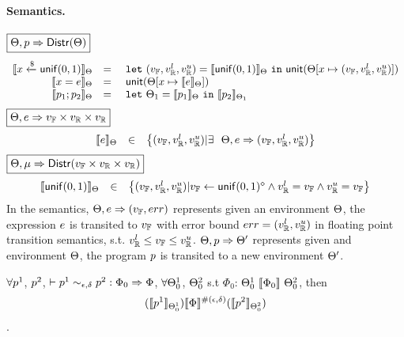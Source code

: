 \documentclass[a4paper,11pt]{article}
\begin{document}
\paragraph{Semantics.}
$\boxed{\Theta, p \Rightarrow \mathsf{Distr}(\Theta)}$
\[
	\begin{array}{rcl}
	\llbracket x \xleftarrow{\$} \mathsf{unif}(0, 1) \rrbracket_{\Theta}
	& = & 
	~\mathtt{let}~ (v_{\mathbb{F}}, v_{\mathbb{R}}^{l}, v_{\mathbb{R}}^{u}) = \llbracket \mathsf{unif}(0, 1) \rrbracket_{\Theta} 
	~\mathtt{in}~ 
	\mathsf{unit}(\Theta[x \mapsto (v_{\mathbb{F}}, v_{\mathbb{R}}^{l}, v_{\mathbb{R}}^{u})])
	\\
	\llbracket x = e \rrbracket_{\Theta}
	& = &  
	~\mathsf{unit}(\Theta[x \mapsto \llbracket e \rrbracket_{\Theta}])
	\\
	\llbracket p_1; p_2 \rrbracket_{\Theta}
	& = &  ~\mathtt{let}~  \Theta_1 = 
	\llbracket p_1 \rrbracket_{\Theta} ~\mathtt{in}~
	\llbracket p_2 \rrbracket_{\Theta_1} 
	\end{array}
\]
$\boxed{\Theta, e \Rightarrow v_{\mathbb{F}} \times v_{\mathbb{R}} \times v_{\mathbb{R}}}$
\[
	\begin{array}{rcl}
	\llbracket e \rrbracket_{\Theta}
	& \in &  
	\big\{(v_{\mathbb{F}}, v_{\mathbb{R}}^{l}, v_{\mathbb{R}}^{u}) |
	\exists ~~  
	\Theta,  
	e \Rightarrow (v_{\mathbb{F}}, v_{\mathbb{R}}^{l}, v_{\mathbb{R}}^{u})\big\}
	\end{array}
\]
$
\boxed{\Theta, \mu \Rightarrow \mathsf{Distr}(v_{\mathbb{F}} \times v_{\mathbb{R}} \times v_{\mathbb{R}})}
$
\[
	\begin{array}{rcl}
	\llbracket \mathsf{unif}(0, 1) \rrbracket_{\Theta}
	& \in & 
	\big\{
	(v_{\mathbb{F}}, v_{\mathbb{R}}^{l}, v_{\mathbb{R}}^{u}) |
	v_{\mathbb{F}} \leftarrow \mathsf{unif}(0, 1)^{\diamond}
	\land v_{\mathbb{R}}^{l} = v_{\mathbb{F}}
	\land v_{\mathbb{R}}^{u} = v_{\mathbb{F}}
	\big\}
	\end{array}
\]
In the semantics, 
$\Theta, e \Rightarrow (v_{\mathbb{F}}, err)$ represents given an environment $\Theta$, the expression $e$
is transited to $v_{\mathbb{F}}$ with error bound $err = (v_{\mathbb{R}}^{l}, v_{\mathbb{R}}^{u})$ in floating point transition semantics, s.t. $v_{\mathbb{R}}^{l} \leq v_{\mathbb{F}} \leq v_{\mathbb{R}}^{u}$. 
$\Theta, p \Rightarrow \Theta'$ represents given and environment $\Theta$, the program $p$ is transited to a new environment $\Theta'$.


\clearpage
\begin{thm}[Soundness]
 $\forall p^1$, $p^2$,  $ \vdash p^1	
\sim_{\epsilon, \delta} 
p^2 :
\Phi_0 \Rightarrow \Phi $,    $\forall \Theta^1_0$, $\Theta^2_0$ 
s.t $\Phi_0$: 
$\Theta^1_0 ~ \llbracket \Phi_0 \rrbracket ~ \Theta^2_0$,
then
$$ 
(\llbracket p^1 \rrbracket_{\Theta^1_0})  
\llbracket \Phi \rrbracket^{\#(\epsilon, \delta)} 
(\llbracket p^2 \rrbracket_{\Theta^2_0}) 
$$.
\end{thm}
\end{document}
